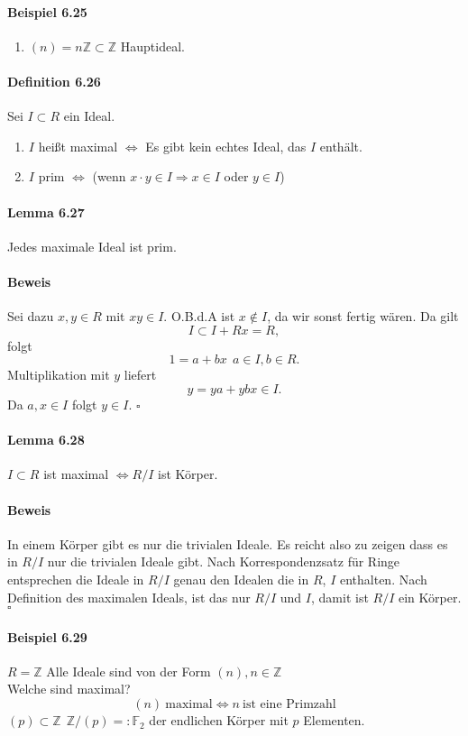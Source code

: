 \documentclass{scrartcl}
\begin{document}
\paragraph{Beispiel 6.25}
\begin{enumerate}
\item $(n) = n\mathbb{Z} \subset \mathbb{Z}$ Hauptideal.
\end{enumerate}

\paragraph{Definition 6.26}
Sei $I \subset R$ ein Ideal.
\begin{enumerate}
\item $I$ heißt maximal $\Leftrightarrow$ Es gibt kein echtes Ideal, das $I$
  enthält.
\item $I$ prim $\Leftrightarrow$ (wenn $x \cdot y \in I \Rightarrow x \in I$
  oder $y \in I$)
\end{enumerate}

\paragraph{Lemma 6.27}
Jedes maximale Ideal ist prim.
\paragraph{Beweis}
Sei dazu $x,y \in R$ mit $xy \in I$. O.B.d.A ist $x \notin I$, da wir sonst
fertig wären. Da gilt
\[
  I \subset I + Rx = R,
\]
folgt
\[
  1 = a + bx~~a \in I, b \in R.
\]
Multiplikation mit $y$ liefert
\[
  y = ya + ybx \in I.
\]
Da $a,x \in I$ folgt $y \in I$.
\hfill $\square$

\paragraph{Lemma 6.28}
$I \subset R$ ist maximal $\Leftrightarrow R/I$ ist Körper.
\paragraph{Beweis}
In einem Körper gibt es nur die trivialen Ideale. Es reicht also zu zeigen dass
es in $R/I$ nur die trivialen Ideale gibt. Nach Korrespondenzsatz für Ringe
entsprechen die Ideale in $R/I$ genau den Idealen die in $R$, $I$ enthalten.
Nach Definition des maximalen Ideals, ist das nur $R/I$ und $I$, damit ist $R/I$
ein Körper.
\hfill $\square$

\paragraph{Beispiel 6.29}
$R = \mathbb{Z}$ Alle Ideale sind von der Form $(n), n \in \mathbb{Z}$ \\
Welche sind maximal?
\[
  (n) ~\text{maximal} \Leftrightarrow n ~\text{ist eine Primzahl}
\]
$(p) \subset \mathbb{Z} ~~ \mathbb{Z}/(p) =: \mathbb{F}_{2}$ der endlichen Körper
mit $p$ Elementen.
\end{document}
